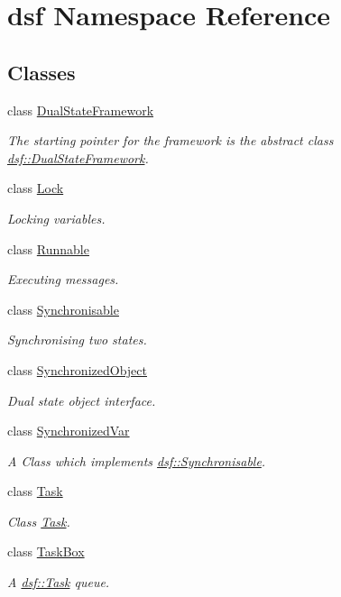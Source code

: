 \hypertarget{namespacedsf}{}\section{dsf Namespace Reference}
\label{namespacedsf}
\subsection*{Classes}
\begin{DoxyCompactItemize}
\item 
class \hyperlink{classdsf_1_1_dual_state_framework}{Dual\+State\+Framework}
\begin{DoxyCompactList}\small\item\em The starting pointer for the framework is the abstract class \hyperlink{classdsf_1_1_dual_state_framework}{dsf\+::\+Dual\+State\+Framework}. \end{DoxyCompactList}\item 
class \hyperlink{classdsf_1_1_lock}{Lock}
\begin{DoxyCompactList}\small\item\em Locking variables. \end{DoxyCompactList}\item 
class \hyperlink{classdsf_1_1_runnable}{Runnable}
\begin{DoxyCompactList}\small\item\em Executing messages. \end{DoxyCompactList}\item 
class \hyperlink{classdsf_1_1_synchronisable}{Synchronisable}
\begin{DoxyCompactList}\small\item\em Synchronising two states. \end{DoxyCompactList}\item 
class \hyperlink{classdsf_1_1_synchronized_object}{Synchronized\+Object}
\begin{DoxyCompactList}\small\item\em Dual state object interface. \end{DoxyCompactList}\item 
class \hyperlink{classdsf_1_1_synchronized_var}{Synchronized\+Var}
\begin{DoxyCompactList}\small\item\em A Class which implements \hyperlink{classdsf_1_1_synchronisable}{dsf\+::\+Synchronisable}. \end{DoxyCompactList}\item 
class \hyperlink{classdsf_1_1_task}{Task}
\begin{DoxyCompactList}\small\item\em Class \hyperlink{classdsf_1_1_task}{Task}. \end{DoxyCompactList}\item 
class \hyperlink{classdsf_1_1_task_box}{Task\+Box}
\begin{DoxyCompactList}\small\item\em A \hyperlink{classdsf_1_1_task}{dsf\+::\+Task} queue. \end{DoxyCompactList}\end{DoxyCompactItemize}
